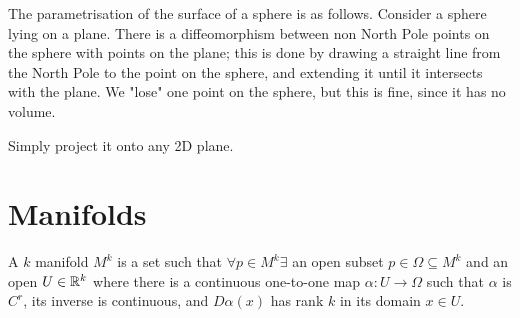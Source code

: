 \documentclass[12pt]{article}
\begin{document}
\begin{ex}[Sphere]
    The parametrisation of the surface of a sphere is as follows. Consider a sphere lying on a plane. There is a diffeomorphism between non North Pole points on the sphere with points on the plane; this is done by drawing a straight line from the North Pole to the point on the sphere, and extending it until it intersects with the plane. We "lose" one point on the sphere, but this is fine, since it has no volume.
\end{ex}

\begin{ex}[Hemisphere]
    Simply project it onto any 2D plane.
\end{ex}

\section{Manifolds}

\begin{defn}[$k$ Manifolds]
    A $k$ manifold $M^k$ is a set such that $\forall p \in M^k \exists$ an open subset $p \in \Omega \subseteq M^k$ and an open $U \in \mathbb{R}^k$ where there is a continuous one-to-one map $\alpha: U \rightarrow \Omega$ such that $\alpha$ is $C^r$, its inverse is continuous, and $D\alpha(x)$ has rank $k$ in its domain $x \in U$.
\end{defn}
\end{document}
